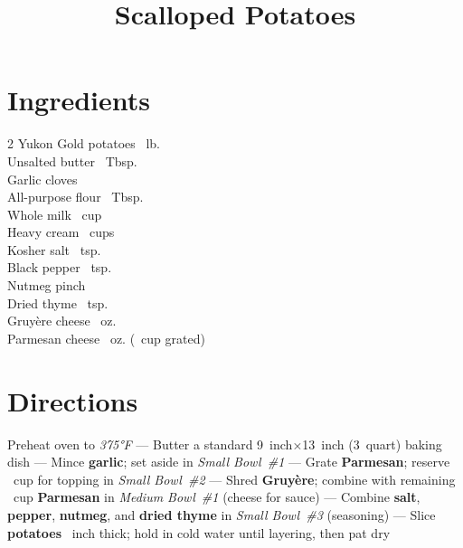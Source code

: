 \documentclass[11pt,letterpaper]{article}
\title{Scalloped Potatoes}
\author{}
\date{}
\begin{document}
\maketitle
\thispagestyle{empty}


\section*{Ingredients}
\setlength{\columnsep}{20pt}
\begin{multicols}{2}
\noindent
    Yukon Gold potatoes ~lb. \\
    Unsalted butter ~Tbsp. \\
    Garlic cloves  \\
    All-purpose flour ~Tbsp. \\
    Whole milk ~cup \\
    \columnbreak
    Heavy cream ~cups \\
    Kosher salt ~tsp. \\
    Black pepper \dotfill {}~tsp. \\
    Nutmeg \dotfill pinch \\
    Dried thyme \dotfill {}~tsp. \\
    Gruyère cheese ~oz. \\
    Parmesan cheese ~oz. (~cup grated) \\
\end{multicols}

\section*{Directions}

\noindent
Preheat oven to \textit{375°F} ---
Butter a standard 9~inch×13~inch (3~quart) baking dish ---
Mince \textbf{garlic}; set aside in \textit{Small Bowl~\#1} ---
Grate \textbf{Parmesan}; reserve ~cup for topping in \textit{Small Bowl~\#2} ---
Shred \textbf{Gruyère}; combine with remaining ~cup \textbf{Parmesan} in \textit{Medium Bowl~\#1} (cheese for sauce) ---
Combine \textbf{salt}, \textbf{pepper}, \textbf{nutmeg}, and \textbf{dried thyme} in \textit{Small Bowl~\#3} (seasoning) ---
Slice \textbf{potatoes} ~inch thick; hold in cold water until layering, then pat dry
\end{document}
